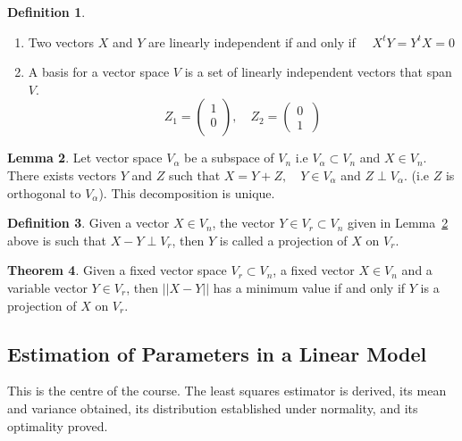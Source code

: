 \documentclass[11pt,a4paper]{article}
\theoremstyle{definition}
\newtheorem{thm}{Theorem}[subsection]
\newtheorem{defn}[thm]{Definition}
\newtheorem{lem}[thm]{Lemma}
\begin{document}
\begin{defn}\label{res:defn:2.2.3}
\begin{enumerate}
\item[i.] Two vectors $X$ and $Y$ are linearly independent if and only if $\quad  X^tY=Y^tX=0$
\item[ii.] A basis for a vector space $V$ is a set of linearly independent vectors that span $V$.
$$Z_1=
\begin{pmatrix}
1\\ 0\\
\end{pmatrix}
,\quad 
Z_2=
\begin{pmatrix}
0\\1\
\end{pmatrix}
$$




\end{enumerate}
\end{defn}


\begin{lem}\label{res:lem:2.2.4}
Let vector space $V_{\alpha}$ be a subspace of $V_n$ i.e $V_{\alpha}\subset V_n$ and $X\in V_n$. There exists vectors $Y$ and $Z$ such that $X=Y+Z,\quad  Y\in V_{\alpha}$ and $Z\perp V_{\alpha}$. (i.e $Z$ is orthogonal to $V_{\alpha}$). This decomposition is unique.
\end{lem}


\begin{defn}\label{res:defn:2.2.5}
Given a vector $X\in V_n$, the vector $Y\in V_r\subset V_n$ given in Lemma~\ref{res:lem:2.2.4} above is such that $X-Y\perp V_r$, then $Y$ is called a projection of $X$ on $V_r$.
\end{defn}

\begin{thm}\label{res:thm:2.2.6}
Given a fixed vector space $V_r\subset V_n$, a fixed vector $X\in V_n$ and a variable vector $Y\in V_r$, then $||X-Y||$ has a minimum value if and only if $Y$ is a projection of $X$ on $V_r$.
\end{thm}


\subsection{Estimation of Parameters in a  Linear Model}
This is the centre of the course. The least squares estimator is derived, its
mean and variance obtained, its distribution established under normality, and
its optimality proved.
\end{document}

